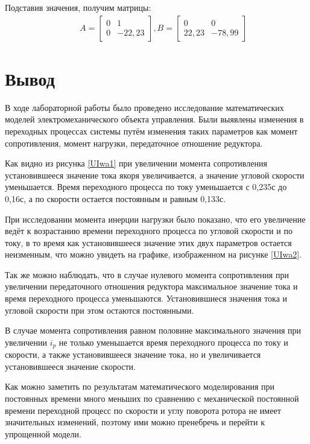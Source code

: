 \documentclass[12pt,a4paper]{article}
\begin{document}
Подставив значения, получим матрицы:
\begin{align}
	&&A =
	\begin{bmatrix}
		0 & 1\\
		0 & -22,23
	\end{bmatrix}, B = 
	\begin{bmatrix}
		0 & 0\\
		22,23 & -78,99
	\end{bmatrix}
\end{align}

\newpage
\section*{Вывод}

В ходе лабораторной работы было проведено исследование математических моделей электромеханического объекта управления. Были выявлены изменения в переходных процессах системы путём изменения таких параметров как момент сопротивления, момент нагрузки, передаточное отношение редуктора.\par
Как видно из рисунка \ref{UIwa1} при увеличении момента сопротивления установившееся значение тока якоря увеличивается, а значение угловой скорости уменьшается. Время переходного процесса по току уменьшается с 0,235с до 0,16с, а по скорости остается постоянным и равным 0,133с.\par
При исследовании момента инерции нагрузки было показано, что его увеличение ведёт к возрастанию времени переходного процесса по угловой скорости и по току, в то время как установившееся значение этих двух параметров остается неизменным, что можно увидеть на графике, изображенном на рисунке \ref{UIwa2}.\par
Так же можно наблюдать, что в случае нулевого момента сопротивления при увеличении передаточного отношения редуктора максимальное значение тока и время переходного процесса уменьшаются. Установившиеся значения тока и угловой скорости при этом остаются постоянными.\par
В случае момента сопротивления равном половине максимального значения при увеличении $i_p$ не только уменьшается время переходного процесса по току и скорости, а также установившееся значение тока, но и увеличивается установившееся значение скорости.\par
Как можно заметить по результатам математического моделирования при постоянных времени много меньших по сравнению с механической постоянной времени переходной процесс по скорости и углу поворота ротора не имеет значительных изменений, поэтому ими можно пренебречь и перейти к упрощенной модели.
\end{document}

